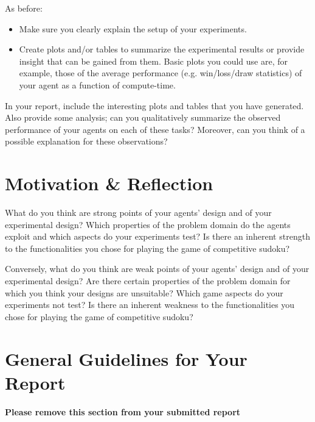 \documentclass[11pt]{article}
\begin{document}
As before:
\begin{itemize}
	\item Make sure you clearly explain the setup of your experiments.
	\item Create plots and/or tables to summarize the experimental results or provide insight that can be gained from them.
	Basic plots you could use are, for example, those of the average performance (e.g. win/loss/draw statistics) of your agent as a function of compute-time.
\end{itemize}

In your report, include the interesting plots and tables that you have generated.
Also provide some analysis; can you qualitatively summarize the observed performance of your agents on each of these tasks?
Moreover, can you think of a possible explanation for these observations?

\section{Motivation \& Reflection}\label{sec:reflect}
What do you think are strong points of your agents' design and of your experimental design?
Which properties of the problem domain do the agents exploit and which aspects do your experiments test?
Is there an inherent strength to the functionalities you chose for playing the game of competitive sudoku?

Conversely, what do you think are weak points of your agents' design and of your experimental design?
Are there certain properties of the problem domain for which you think your designs are unsuitable?
Which game aspects do your experiments not test?
Is there an inherent weakness to the functionalities you chose for playing the game of competitive sudoku?


\section*{General Guidelines for Your Report}
\textbf{Please remove this section from your submitted report}
\end{document}
